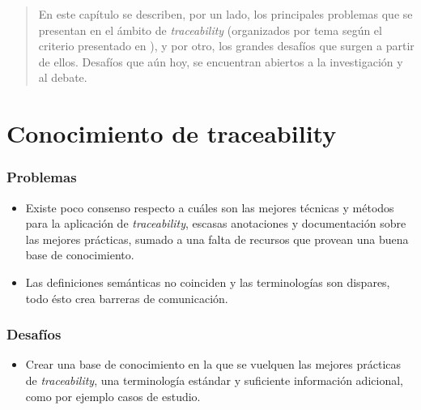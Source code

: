 \documentclass[a4paper,12pt,twoside,spanish,openright]{book}
\begin{document}
\begin{quotation}
En este capítulo se describen, por un lado, los principales problemas que se presentan en el ámbito de \textit{traceability} (organizados por tema según el criterio presentado en \cite{Excellence}), y por otro, los grandes desafíos que surgen a partir de ellos. Desafíos que aún hoy, se encuentran abiertos a la investigación y al debate.
\end{quotation}


\bigskip


\minitoc 


\clearpage


\section{Conocimiento de traceability}

\subsubsection{Problemas}

\begin{itemize}[label={$\times$}]

\item Existe poco consenso respecto a cuáles son las mejores técnicas y métodos para la aplicación de \textit{traceability}, escasas anotaciones y documentación sobre las mejores prácticas, sumado a una falta de recursos que provean una buena base de conocimiento.

\item Las definiciones semánticas no coinciden y las terminologías son dispares, todo ésto crea barreras de comunicación.

\end{itemize}

\subsubsection{Desafíos}

\begin{itemize}[label={\checkmark}]

\item Crear una base de conocimiento en la que se vuelquen las mejores prácticas de \textit{traceability}, una terminología estándar y suficiente información adicional, como por ejemplo casos de estudio.

\end{itemize}
\end{document}
